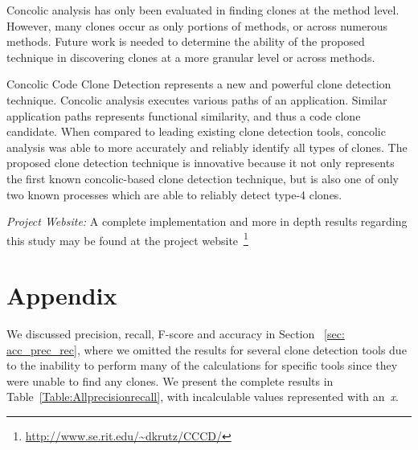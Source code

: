 \documentclass[smallextended]{svjour3}       %
\begin{document}
Concolic analysis has only been evaluated in finding clones at the method level. However, many clones occur as only portions of methods, or across numerous methods. Future work is needed to determine the ability of the proposed technique in discovering clones at a more granular level or across methods.

Concolic Code Clone Detection represents a new and powerful clone detection technique. Concolic analysis executes various paths of an application. Similar application paths represents functional similarity, and thus a code clone candidate. When compared to leading existing clone detection tools, concolic analysis was able to more accurately and reliably identify all types of clones. The proposed clone detection technique is innovative because it not only represents the first known concolic-based clone detection technique, but is also one of only two known processes which are able to reliably detect type-4 clones.


\emph{Project Website:}
A complete implementation and more in depth results regarding this study may be found at the project website~\footnote{\url{http://www.se.rit.edu/~dkrutz/CCCD/}}





\appendix
\section{Appendix}

We discussed precision, recall, F-score and accuracy in Section ~\ref{sec: acc_prec_rec}, where we omitted the results for several clone detection tools due to the inability to perform many of the calculations for specific tools since they were unable to find any clones. We present the complete results in Table~\ref{Table:Allprecisionrecall}, with incalculable values represented with an~\emph{x}.
\end{document}

